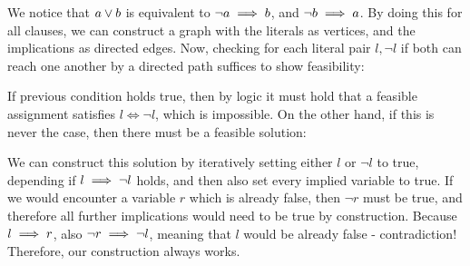 \begin{aufgabe}
	We notice that $a \vee b$ is equivalent to $\neg a \implies b$, and $\neg b \implies a$.
	By doing this for all clauses, we can construct a graph with the literals as vertices,
	and the implications as directed edges. Now, checking for each literal pair $l, \neg l$ if both can reach
	one another by a directed path suffices to show feasibility:

	If previous condition holds true, then by logic it must hold that a feasible assignment satisfies $l \Leftrightarrow \neg l$,
	which is impossible. On the other hand, if this is never the case, then there must be a feasible solution:

	We can construct this solution by iteratively setting either $l$ or $\neg l$ to true, depending if $l \implies \neg l$ holds, and then
	also set every implied variable to true. If we would encounter a variable $r$ which is already false, then
	$\neg r$ must be true, and therefore all further implications would need to be true by construction.
	Because $l \implies r$, also $\neg r \implies \neg l$, meaning that $l$ would be already false - contradiction!\\
	Therefore, our construction always works.


\end{aufgabe}
